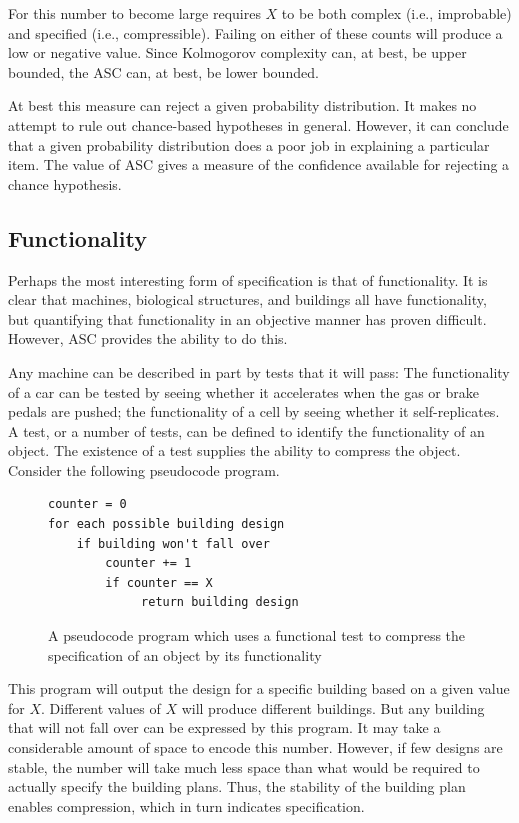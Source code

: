 For this number to become large requires $X$ to be both complex (i.e., improbable) and specified (i.e., compressible).
Failing on either of these counts will produce a low or negative value.
Since Kolmogorov complexity can, at best, be upper bounded, the ASC can, at best, be lower bounded.

At best this measure can reject a given probability distribution.
It makes no attempt to rule out chance-based hypotheses in general.
However, it can conclude that a given probability distribution does a poor job in explaining a particular item.
The value of ASC gives a measure of the confidence available for rejecting a chance hypothesis.

\subsection{Functionality}

Perhaps the most interesting form of specification is that of functionality.
It is clear that machines, biological structures, and buildings all have functionality,
but quantifying that functionality in an objective manner has proven difficult.
However, ASC provides the ability to do this.

Any machine can be described in part by tests that it will pass:
The functionality of a car can be tested by seeing whether it accelerates when the gas or brake pedals are pushed;
the functionality of a cell by seeing whether it self-replicates.
A test, or a number of tests, can be defined to identify the functionality of an object. 
The existence of a test supplies the ability to compress the object.
Consider the following pseudocode program.

\begin{figure}[H]
\begin{mdframed}
\begin{verbatim}
counter = 0
for each possible building design
    if building won't fall over
        counter += 1
        if counter == X
             return building design
\end{verbatim} 
\end{mdframed}
\caption{A pseudocode program which uses a functional test to compress the specification of an object by its functionality}
\end{figure}
This program will output the design for a specific building based on a given value for $X$.
Different values of $X$ will produce different buildings.
But any building that will not fall over can be expressed by this program.
It may take a considerable amount of space to encode this number.
However, if few designs are stable, the number will take much less space than what would be required to actually specify the building plans.
Thus, the stability of the building plan enables compression, which in turn indicates specification.

